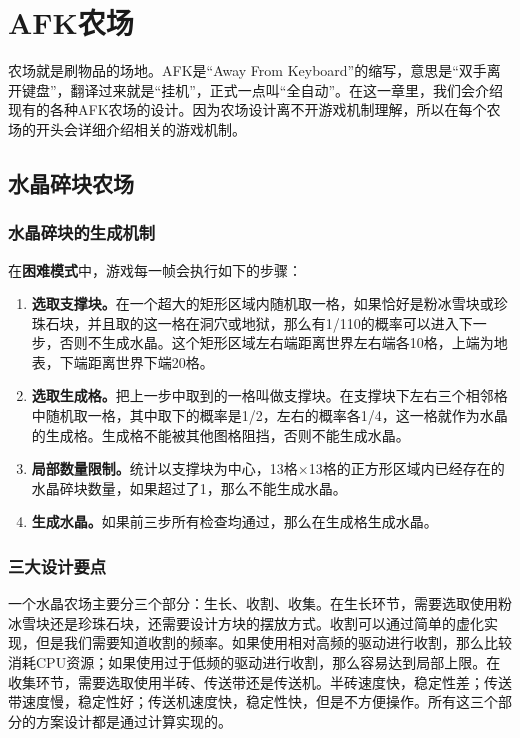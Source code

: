 \chapter{AFK农场}

农场就是刷物品的场地。AFK是“Away From Keyboard”的缩写，意思是“双手离开键盘”，翻译过来就是“挂机”，正式一点叫“全自动”。在这一章里，我们会介绍现有的各种AFK农场的设计。因为农场设计离不开游戏机制理解，所以在每个农场的开头会详细介绍相关的游戏机制。

\section{水晶碎块农场}
\subsection{水晶碎块的生成机制}
在\textbf{困难模式}中，游戏每一帧会执行如下的步骤：
\begin{enumerate}
    \item \textbf{选取支撑块。}在一个超大的矩形区域内随机取一格，如果恰好是粉冰雪块或珍珠石块，并且取的这一格在洞穴或地狱，那么有1/110的概率可以进入下一步，否则不生成水晶。这个矩形区域左右端距离世界左右端各10格，上端为地表，下端距离世界下端20格。
    \item \textbf{选取生成格。}把上一步中取到的一格叫做支撑块。在支撑块下左右三个相邻格中随机取一格，其中取下的概率是1/2，左右的概率各1/4，这一格就作为水晶的生成格。生成格不能被其他图格阻挡，否则不能生成水晶。
    \item \textbf{局部数量限制。}统计以支撑块为中心，13格$\times$13格的正方形区域内已经存在的水晶碎块数量，如果超过了1，那么不能生成水晶。
    \item \textbf{生成水晶。}如果前三步所有检查均通过，那么在生成格生成水晶。
\end{enumerate}

\subsection{三大设计要点}
一个水晶农场主要分三个部分：生长、收割、收集。在生长环节，需要选取使用粉冰雪块还是珍珠石块，还需要设计方块的摆放方式。收割可以通过简单的虚化实现，但是我们需要知道收割的频率。如果使用相对高频的驱动进行收割，那么比较消耗CPU资源；如果使用过于低频的驱动进行收割，那么容易达到局部上限。在收集环节，需要选取使用半砖、传送带还是传送机。半砖速度快，稳定性差；传送带速度慢，稳定性好；传送机速度快，稳定性快，但是不方便操作。所有这三个部分的方案设计都是通过计算实现的。

